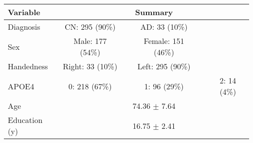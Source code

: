 \section*{}

    \centering 


\begin{table}[ht]
\centering
\scriptsize %
\begin{tabular}{lccccc}
\hline
\textbf{Variable} & \multicolumn{5}{c}{\textbf{Summary}} \\ 
\hline
Diagnosis & CN: 295 (90\%) & & AD: 33 (10\%) & & \\
\hline
Sex & Male: 177 (54\%) & & Female: 151 (46\%) & & \\
\hline
Handedness & Right: 33 (10\%) & & Left: 295 (90\%) & & \\
\hline
APOE4 & 0: 218 (67\%) & & 1: 96 (29\%) & & 2: 14 (4\%) \\
\hline
Age & \multicolumn{5}{c}{74.36 \(\pm\) 7.64} \\
\hline
Education (y) & \multicolumn{5}{c}{16.75 \(\pm\) 2.41} \\
\hline
\end{tabular}
\label{tab:variable_summary}
\end{table}


